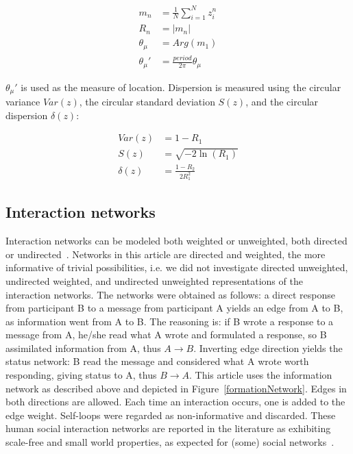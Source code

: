 \documentclass[%
 aip,
 jmp,%
 amsmath,amssymb,
 reprint,%
]{revtex4-1}
\begin{document}
\begin{align}\label{eq:cmom}
	m_n&=\frac{1}{N}\sum_{i=1}^N z_i^n \nonumber\\
	R_n&=|m_n|\\
	\theta_\mu&=Arg(m_1) \nonumber \\
	\theta_\mu'&=\frac{period}{2\pi} \theta_\mu \nonumber
\end{align}

$\theta_\mu'$ is used as the measure of location. Dispersion is measured using the circular variance $Var(z)$, the circular standard deviation $S(z)$, and the circular dispersion $\delta(z)$:

\begin{align}\label{eq:cmd}
	Var(z)&=1 - R_1 \nonumber\\
	S(z)&= \sqrt{-2\ln(R_1)}\\
	\delta(z)&=\frac{1-R_2}{2 R_1^2} \nonumber
\end{align}


\subsection{Interaction networks}\label{intNet}
Interaction networks can be modeled both weighted or unweighted, both directed or undirected~\cite{bird,newmanCommunityDirected,newmanCommunity2013}.
Networks in this article are directed and weighted, the more informative of trivial possibilities, i.e. we did not investigate directed unweighted, undirected weighted, and undirected unweighted representations of the interaction networks. 
The networks were obtained as follows: a direct response from participant B to a message from participant A yields an edge from A to B, as information went from A to B. The reasoning is: if B wrote a response to a message from A, he/she read what A wrote and formulated a response, so B assimilated information from A, thus $A \rightarrow B$. Inverting edge direction yields the status network: B read the message and considered what A wrote worth responding, giving status to A, thus $B\rightarrow A$. This article uses the information network as described above and depicted in Figure~\ref{formationNetwork}. Edges in both directions are allowed. Each time an interaction occurs, one is added to the edge weight. Self-loops were regarded as non-informative and discarded. These human social interaction networks are reported in the literature as exhibiting scale-free and small world properties, as expected for (some) social networks~\cite{bird,newmanBook}.
\end{document}
